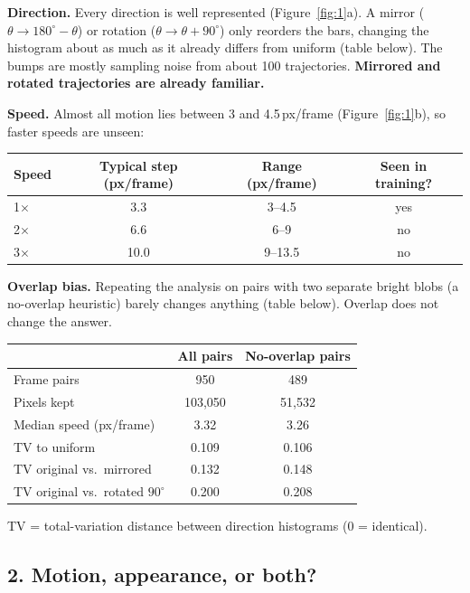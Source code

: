 \documentclass[11pt, a4paper]{article}
\begin{document}
\textbf{Direction.} Every direction is well represented (Figure~\ref{fig:1}a). A mirror ($\theta \to 180^\circ - \theta$) or rotation ($\theta \to \theta + 90^\circ$) only reorders the bars, changing the histogram about as much as it already differs from uniform (table below). The bumps are mostly sampling noise from about 100 trajectories. \textbf{Mirrored and rotated trajectories are already familiar.}

\textbf{Speed.} Almost all motion lies between 3 and 4.5\,px/frame (Figure~\ref{fig:1}b), so faster speeds are unseen:

\begin{center}
\begin{tabular}{lccc}
\toprule
Speed & Typical step (px/frame) & Range (px/frame) & Seen in training? \\
\midrule
1$\times$ & 3.3 & 3--4.5 & yes \\
2$\times$ & 6.6 & 6--9 & no \\
3$\times$ & 10.0 & 9--13.5 & no \\
\bottomrule
\end{tabular}
\end{center}

\textbf{Overlap bias.} Repeating the analysis on pairs with two separate bright blobs (a no-overlap heuristic) barely changes anything (table below). Overlap does not change the answer.

\begin{center}
\begin{tabular}{lcc}
\toprule
 & All pairs & No-overlap pairs \\
\midrule
Frame pairs & 950 & 489 \\
Pixels kept & 103,050 & 51,532 \\
Median speed (px/frame) & 3.32 & 3.26 \\
TV to uniform & 0.109 & 0.106 \\
TV original vs.\ mirrored & 0.132 & 0.148 \\
TV original vs.\ rotated $90^\circ$ & 0.200 & 0.208 \\
\bottomrule
\end{tabular}

\smallskip
{\small TV = total-variation distance between direction histograms (0 = identical).}
\end{center}

\subsection*{2. Motion, appearance, or both?}
\end{document}
